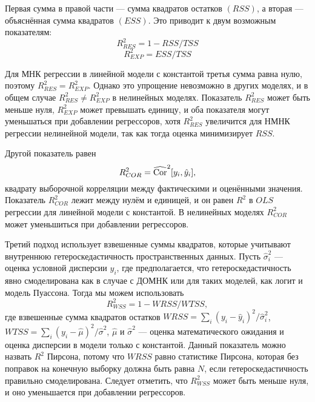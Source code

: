Первая сумма в правой части --- сумма квадратов остатков $(RSS)$, а вторая --- объяснённая сумма квадратов $(ESS)$. Это приводит к двум возможным показателям:
\[
R_{RES}^2 = 1 - RSS/TSS
\]
\[
R_{EXP}^2 = ESS/TSS
\]

Для МНК регрессии в линейной модели с константой третья сумма равна нулю, поэтому $R_{RES}^2 = R_{EXP}^2$. Однако это упрощение невозможно в других моделях, и в общем случае $R_{RES}^2 \not= R_{EXP}^2$ в нелинейных моделях. Показатель $R_{RES}^2$ может быть меньше нуля, $R_{EXP}^2$ может превышать единицу, и оба показателя могут уменьшаться при добавлении регрессоров, хотя $R_{RES}^2$ увеличится для НМНК регрессии нелинейной модели, так как тогда оценка минимизирует $RSS$.

Другой показатель равен
\[
R_{COR}^2 = \widehat{\mathrm{Cor}}^2[y_i, \hat{y}_i],
\]
квадрату выборочной корреляции между фактическими и оценёнными значения. Показатель $R_{COR}^2$ лежит между нулём и единицей, и он равен $R^2$ в $OLS$ регрессии для линейной модели с константой. В нелинейных моделях $R_{COR}^2$ может уменьшиться при добавлении регрессоров. 

Третий подход использует взвешенные суммы квадратов, которые учитывают внутреннюю гетероскедастичность пространственных данных. Пусть $\hat{\sigma}_i^2$ --- оценка условной дисперсии $y_i$, где предполагается, что гетероскедастичность явно смоделирована как в случае с ДОМНК или для таких моделей, как логит и модель Пуассона. Тогда мы можем использовать
\[
R_{WSS}^2 = 1 - WRSS/WTSS,
\]
где взвешенные сумма квадратов остатков $WRSS = \sum_i (y_i - \hat{y}_i)^2/\hat{\sigma}_i^2$, $WTSS = \sum_i (y_i - \hat{\mu})^2/\hat{\sigma}^2$, $\hat{\mu}$ и $\hat{\sigma}^2$ --- оценка математического ожидания и оценка дисперсии в модели только с константой. Данный показатель можно назвать $R^2$ Пирсона, потому что $WRSS$ равно статистике Пирсона, которая без поправок на конечную выборку должна быть равна $N$, если гетероскедастичность правильно смоделирована. Следует отметить, что $R_{WSS}^2$ может быть меньше нуля, и оно уменьшается при добавлении регрессоров.

